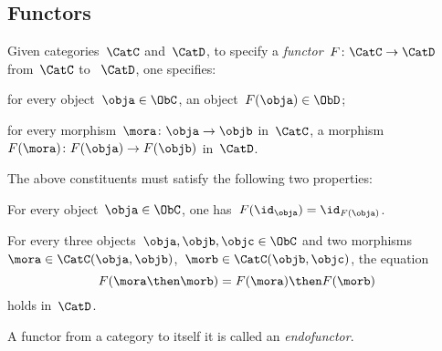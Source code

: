 \subsection{Functors}
\begin{ctdefinition}[Functor]
\label{def:functor}
Given categories~$\CatC$ and~$\CatD$, to specify a \emph{functor}~$F\colon \CatC\to \CatD$ from~$\CatC$ to ~$\CatD$, one specifies:
\begin{compactenum}
    \item for every object~$\obja \in \ObC$, an object~$F(\obja)\in \ObD$;
    \item for every morphism~$\mora \colon \obja \to \objb$ in~$\CatC$, a morphism~$F(\mora)\colon F(\obja)\to F(\objb)$ in~$\CatD$.
\end{compactenum}
The above constituents must satisfy the following two properties:
\begin{compactenum}[(a)]
    \item For every object~$\obja\in \ObC$, one has~$F(\id_\obja)=\id_{F(\obja)}$.
    \item For every three objects~$\obja,\objb,\objc \in \ObC$ and two morphisms~$\mora \in \CatC(\obja,\objb)$,~$\morb\in \CatC(\objb,\objc)$, the equation 
    \begin{equation}
        F(\mora \then \morb)=F(\mora)\then F(\morb)
    \end{equation}
holds in~$\CatD$.
\end{compactenum}
\end{ctdefinition}

\begin{remark}
A functor from a category to itself it is called an \emph{endofunctor}.
\end{remark} 


